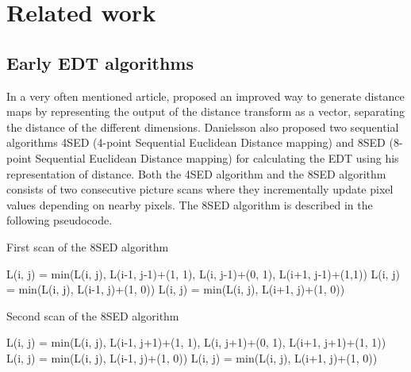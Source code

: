 \chapter{Related work}\label{cha:relatedwork}
\section{Early EDT algorithms}\label{earlyedt}
In a very often mentioned article, \citet{Danielsson} proposed an improved way to generate distance maps by representing the output of the distance transform as a vector, separating the distance of the different dimensions. Danielsson also proposed two sequential algorithms 4SED (4-point Sequential Euclidean Distance mapping) and 8SED (8-point Sequential Euclidean Distance mapping) for calculating the EDT using his representation of distance. Both the 4SED algorithm and the 8SED algorithm consists of two consecutive picture scans where they incrementally update pixel values depending on nearby pixels. The 8SED algorithm is described in the following pseudocode.\vspace{\baselineskip}\newline
\begin{algorithm}[H]
\caption{First scan of the 8SED algorithm}
\begin{algorithmic}
		\State L(i, j) = min(L(i, j), L(i-1, j-1)+(1, 1), L(i, j-1)+(0, 1), L(i+1, j-1)+(1,1))\;
	\EndFor
		\State L(i, j) = min(L(i, j), L(i-1, j)+(1, 0))\;
	\EndFor
		\State L(i, j) = min(L(i, j), L(i+1, j)+(1, 0))\;
	\EndFor
\EndFor
\end{algorithmic}
\end{algorithm}
\vspace{\baselineskip}
\begin{algorithm}
\caption{Second scan of the 8SED algorithm}
\begin{algorithmic}[H]
		\State L(i, j) = min(L(i, j), L(i-1, j+1)+(1, 1), L(i, j+1)+(0, 1), L(i+1, j+1)+(1, 1))\;
	\EndFor
		\State L(i, j) = min(L(i, j), L(i-1, j)+(1, 0))\;
	\EndFor
		\State L(i, j) = min(L(i, j), L(i+1, j)+(1, 0))\;
	\EndFor
\EndFor
\end{algorithmic}
\end{algorithm}\vspace{\baselineskip}

